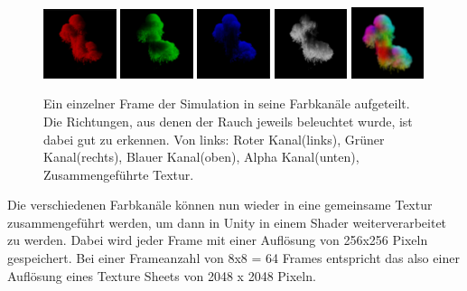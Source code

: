 \begin{figure}[h!]
	\centering
	\includegraphics[width=0.19\textwidth]{Grafiken/Implementation/Lightmaps/T1_R.png}
	\includegraphics[width=0.19\textwidth]{Grafiken/Implementation/Lightmaps/T1_G.png}
	\includegraphics[width=0.19\textwidth]{Grafiken/Implementation/Lightmaps/T1_B.png}
	\includegraphics[width=0.19\textwidth]{Grafiken/Implementation/Lightmaps/T1_A.png}
	\includegraphics[width=0.19\textwidth]{Grafiken/Implementation/Lightmaps/merged.png}

	\begin{footnotesize}
		\caption{Ein einzelner Frame der Simulation in seine Farbkanäle aufgeteilt. Die Richtungen, aus denen der Rauch jeweils beleuchtet wurde, ist dabei gut zu erkennen.
			Von links: Roter Kanal(links), Grüner Kanal(rechts), Blauer Kanal(oben), Alpha Kanal(unten), Zusammengeführte Textur.}
		\label{fig:lightDirections}
	\end{footnotesize}
\end{figure}


Die verschiedenen Farbkanäle können nun wieder in eine gemeinsame Textur zusammengeführt werden, um dann in Unity in einem Shader weiterverarbeitet zu werden.
Dabei wird jeder Frame mit einer Auflösung von 256x256 Pixeln gespeichert. Bei einer Frameanzahl von 8x8 = 64 Frames entspricht das also
einer Auflösung eines Texture Sheets von 2048 x 2048 Pixeln.


